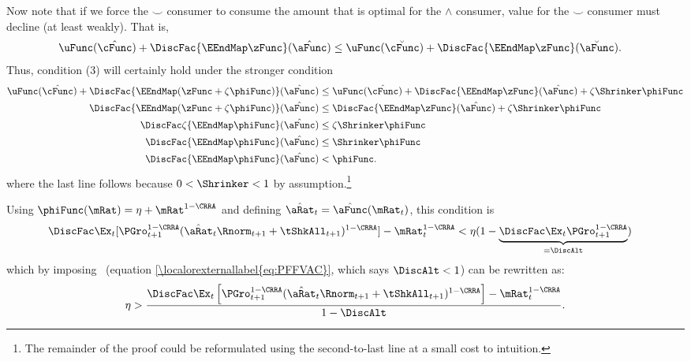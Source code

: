 \documentclass[\econtexRoot/BufferStockTheory.tex]{subfiles}
\begin{document}
Now note that if we force the $\smile$ consumer to consume the amount that is
optimal for the $\wedge$ consumer, value for the $\smile$ consumer must decline (at least weakly).  That is,
\begin{align*}
\uFunc(\hat{\cFunc})+\DiscFac \{\EEndMap \zFunc \}(\hat{\aFunc})  & \leq \uFunc(\breve{\cFunc})+\DiscFac \{\EEndMap \zFunc \}(\breve{\aFunc})
.
\end{align*}
Thus, condition (3) will certainly hold under the stronger condition
\begin{align*}
\uFunc(\hat{\cFunc})+\DiscFac\{\EEndMap (\zFunc+\zeta \phiFunc) \}(\hat{\aFunc})  & \leq  \uFunc(\hat{\cFunc})+\DiscFac\{\EEndMap \zFunc \}(\hat{\aFunc})  + \zeta \Shrinker \phiFunc
\\ \DiscFac\{\EEndMap (\zFunc+\zeta \phiFunc) \}(\hat{\aFunc})  & \leq  \DiscFac\{\EEndMap \zFunc  \}(\hat{\aFunc})  + \zeta \Shrinker \phiFunc
\\ \DiscFac\zeta \{\EEndMap \phiFunc \}(\hat{\aFunc})  & \leq  \zeta \Shrinker \phiFunc
\\ \DiscFac\{\EEndMap \phiFunc \}(\hat{\aFunc})  & \leq  \Shrinker \phiFunc
\\ \DiscFac\{\EEndMap \phiFunc \}(\hat{\aFunc})   & < \phiFunc %
.
\end{align*}
where the last line follows because $0 < \Shrinker < 1$ by assumption.\footnote{The remainder of the proof could be reformulated using the second-to-last line at a small cost to intuition.}

Using $\phiFunc(\mRat)= \eta + \mRat^{1-\CRRA}$
and defining $\hat{\aRat}_{t}=\hat{\aFunc}(\mRat_{t})$, this condition is
\begin{align*}
\DiscFac \Ex_{t}[{\PGro}_{t+1}^{1-\CRRA}(\hat{\aRat}_{t}\Rnorm_{t+1}+\tShkAll_{t+1})^{1-\CRRA}]-\mRat_{t}^{1-\CRRA}  & < \eta(1-\underbrace{\DiscFac\Ex_{t}{\PGro}_{t+1}^{1-\CRRA}}_{=\DiscAlt})
\end{align*}
which by imposing \PFFVAC~(equation \eqref{\localorexternallabel{eq:PFFVAC}}, which says $\DiscAlt<1$) can be rewritten as:
\begin{align}
 \eta>\frac{\DiscFac \Ex_{t}\left[{\PGro}_{t+1}^{1-\CRRA}(\hat{\aRat}_{t}\Rnorm_{t+1}+\tShkAll_{t+1})^{1-\CRRA}\right]-\mRat_{t}^{1-\CRRA}}{1-\DiscAlt}\label{eq:KeyCondition}.
\end{align}
\end{document}
